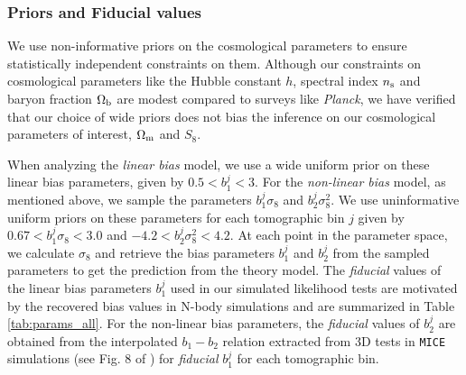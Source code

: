 \documentclass[aps, prd,twocolumn,superscriptaddress,nofootinbib,preprintnumbers]{revtex4-1}
\newcommand{\mice}{\texttt{MICE} }
\newcommand{\IR}[1]{{\color{red}[\textbf{Note for IR}: #1]}}
\begin{document}



\subsubsection{Priors and Fiducial values}
\label{sec:prior}
We use non-informative priors on the cosmological parameters to ensure statistically independent constraints on them. Although our constraints on cosmological parameters like the Hubble constant $h$, spectral index $n_{\rm s}$ and baryon fraction $\Omega_{\rm b}$ are modest compared to surveys like \textit{Planck}, we have verified that our choice of wide priors does not bias the inference on our cosmological parameters of interest, $\Omega_{\rm m}$ and $S_8$. 

When analyzing the \textit{linear bias} model, we use a wide uniform prior on these linear bias parameters, given by $0.5 < b^{j}_1 < 3$. For the \textit{non-linear bias} model, as mentioned above, we sample the parameters $b^{j}_1 \sigma_8$ and $b^{j}_2 \sigma^2_8$. We use uninformative uniform priors on these parameters for each tomographic bin $j$ given by $0.67 < b^{j}_1 \sigma_8 < 3.0$ and $-4.2 < b^{j}_2 \sigma^2_8 < 4.2$. At each point in the parameter space, we calculate  $\sigma_8$ and retrieve the bias parameters $b^{j}_1$ and $b^{j}_2$ from the sampled parameters to get the prediction from the theory model. The \textit{fiducial} values of the linear bias parameters $b^{j}_1$ used in our simulated likelihood tests are motivated by the  recovered bias values in N-body simulations and are summarized in Table \ref{tab:params_all}. 
For the non-linear bias parameters, the \textit{fiducial} values of $b^{j}_2$ are obtained from the interpolated $b_1-b_2$ relation extracted from 3D tests in \mice simulations (see Fig. 8 of \citet*{p2020perturbation}) for \textit{fiducial} $b^j_1$ for each tomographic bin.
\end{document}
